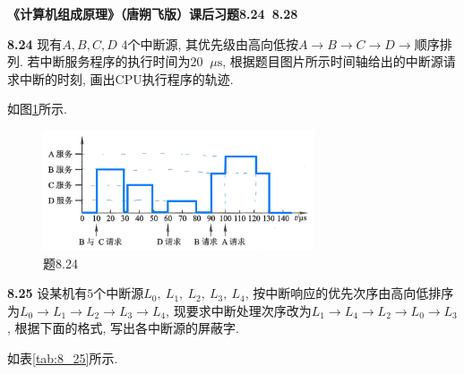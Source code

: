 \documentclass[UTF8]{report}
\newcommand{\mrm}[1]{\mathrm{#1}}
\newcommand{\problem}[1]{{\setlength{\parskip}{10pt}\noindent \bf{#1}}}
\newenvironment{solution}{{\noindent\hskip 2em \bf 解 \quad}}{}
\begin{document}

\maketitle



\textbf{《计算机组成原理》（唐朔飞版）课后习题8.24~8.28}

\problem{8.24} 现有$A, B, C, D$ $4$个中断源, 其优先级由高向低按$A \to B \to C \to D \to $顺序排列. 若中断服务程序的执行时间为$20 \mathop{}\!\mu \mrm s$, 根据题目图片所示时间轴给出的中断源请求中断的时刻, 画出CPU执行程序的轨迹. 

\begin{solution}
    如图\ref{fig:8_24}所示. 
    \begin{figure}[htbp]
        \centering
        \includegraphics[width=8cm]{fig/8.24.png}
        \caption{题8.24}
        \label{fig:8_24}
    \end{figure}
\end{solution}


\problem{8.25} 设某机有$5$个中断源$L_0,\ L_1,\ L_2,\ L_3,\ L_4$, 按中断响应的优先次序由高向低排序为$L_0 \to L_1 \to L_2 \to L_3 \to L_4$, 现要求中断处理次序改为$L_1 \to L_4 \to L_2 \to L_0 \to L_3$, 根据下面的格式, 写出各中断源的屏蔽字. 

\begin{solution}
    如表\ref{tab:8_25}所示.
\end{solution}
\end{document}
